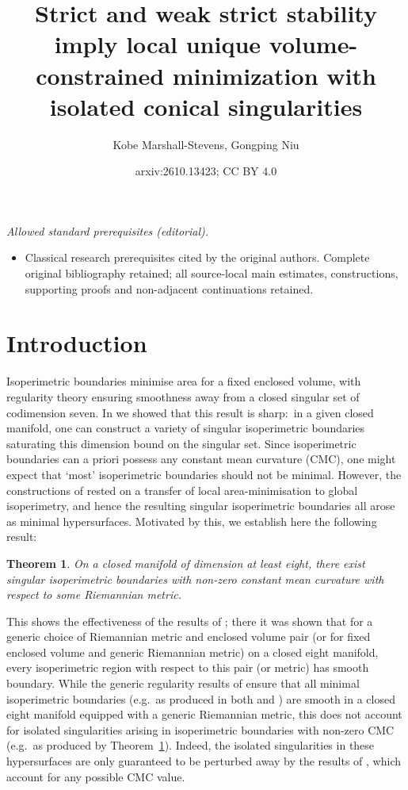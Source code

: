 \documentclass[12pt]{article}
\title{Strict and weak strict stability imply local unique volume-constrained minimization with isolated conical singularities}
\author{Kobe Marshall-Stevens, Gongping Niu}
\date{arxiv:2610.13423; CC BY 4.0}
\newtheorem{theorem}{Theorem}
\begin{document}
\maketitle
\noindent\textit{Allowed standard prerequisites (editorial).}\begin{itemize}
\item Classical research prerequisites cited by the original authors. Complete original bibliography retained; all source-local main estimates, constructions, supporting proofs and non-adjacent continuations retained.
\end{itemize}\medskip
\section{Introduction}

Isoperimetric boundaries minimise area for a fixed enclosed volume, with regularity theory ensuring smoothness away from a closed singular set of codimension seven. In \cite{MN26} we showed that this result is sharp:~in a given closed manifold, one can construct a variety of singular isoperimetric boundaries saturating this dimension bound on the singular set. Since isoperimetric boundaries can a priori possess any constant mean curvature (CMC), one might expect that `most' isoperimetric boundaries should not be minimal. However, the constructions of \cite{MN26} rested on a transfer of local area-minimisation to global isoperimetry, and hence the resulting singular isoperimetric boundaries all arose as minimal hypersurfaces. Motivated by this, we establish here the following result:

\begin{theorem}\label{thm: CMC singular isop}
    On a closed manifold of dimension at least eight, there exist singular isoperimetric boundaries with non-zero constant mean curvature with respect to some Riemannian metric.
\end{theorem}

This shows the effectiveness of the results of \cite{MNP25}; there it was shown that for a generic choice of Riemannian metric and enclosed volume pair (or for fixed enclosed volume and generic Riemannian metric) on a closed eight manifold, every isoperimetric region with respect to this pair (or metric) has smooth boundary. While the generic regularity results of \cite{LW25} ensure that all minimal isoperimetric boundaries (e.g.~as produced in both \cite{MN26} and \cite{N24}) are smooth in a closed eight manifold equipped with a generic Riemannian metric, this does not account for isolated singularities arising in isoperimetric boundaries with non-zero CMC (e.g.~as produced by Theorem~\ref{thm: CMC singular isop}). Indeed, the isolated singularities in these hypersurfaces are only guaranteed to be perturbed away by the results of \cite{MNP25}, which account for any possible CMC value.
\end{document}

